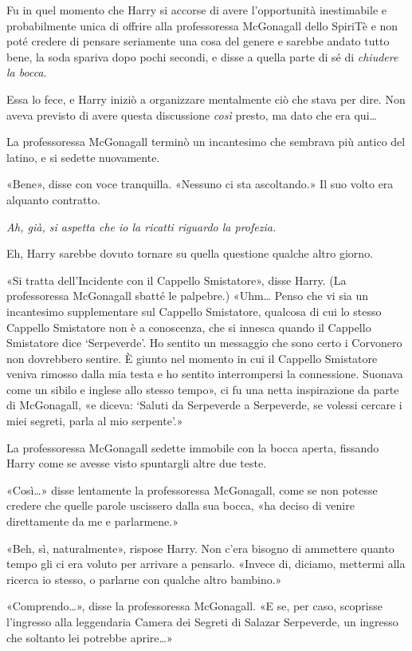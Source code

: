 Fu in quel momento che Harry si accorse di avere l’opportunità inestimabile e probabilmente unica di offrire alla professoressa McGonagall dello SpiriTè e non poté credere di pensare seriamente una cosa del genere e sarebbe andato tutto bene, la soda spariva dopo pochi secondi, e disse a quella parte di sé di \textit{chiudere la bocca}.

Essa lo fece, e Harry iniziò a organizzare mentalmente ciò che stava per dire. Non aveva previsto di avere questa discussione \textit{così} presto, ma dato che era qui…

La professoressa McGonagall terminò un incantesimo che sembrava più antico del latino, e si sedette nuovamente.

«Bene», disse con voce tranquilla. «Nessuno ci sta ascoltando.» Il suo volto era alquanto contratto.

\textit{Ah, già, si aspetta che io la ricatti riguardo la profezia.}

Eh, Harry sarebbe dovuto tornare su quella questione qualche altro giorno.

«Si tratta dell’Incidente con il Cappello Smistatore», disse Harry. (La professoressa McGonagall sbatté le palpebre.) «Uhm… Penso che vi sia un incantesimo supplementare sul Cappello Smistatore, qualcosa di cui lo stesso Cappello Smistatore non è a conoscenza, che si innesca quando il Cappello Smistatore dice ‘Serpeverde’. Ho sentito un messaggio che sono certo i Corvonero non dovrebbero sentire. È giunto nel momento in cui il Cappello Smistatore veniva rimosso dalla mia testa e ho sentito interrompersi la connessione. Suonava come un sibilo e inglese allo stesso tempo», ci fu una netta inspirazione da parte di McGonagall, «e diceva: ‘Saluti da Serpeverde a Serpeverde, se volessi cercare i miei segreti, parla al mio serpente’.»

La professoressa McGonagall sedette immobile con la bocca aperta, fissando Harry come se avesse visto spuntargli altre due teste.

«Così…» disse lentamente la professoressa McGonagall, come se non potesse credere che quelle parole uscissero dalla sua bocca, «ha deciso di venire direttamente da me e parlarmene.»

«Beh, sì, naturalmente», rispose Harry. Non c’era bisogno di ammettere quanto tempo gli ci era voluto per arrivare a pensarlo. «Invece di, diciamo, mettermi alla ricerca io stesso, o parlarne con qualche altro bambino.»

«Comprendo…», disse la professoressa McGonagall. «E se, per caso, scoprisse l’ingresso alla leggendaria Camera dei Segreti di Salazar Serpeverde, un ingresso che soltanto lei potrebbe aprire…»

